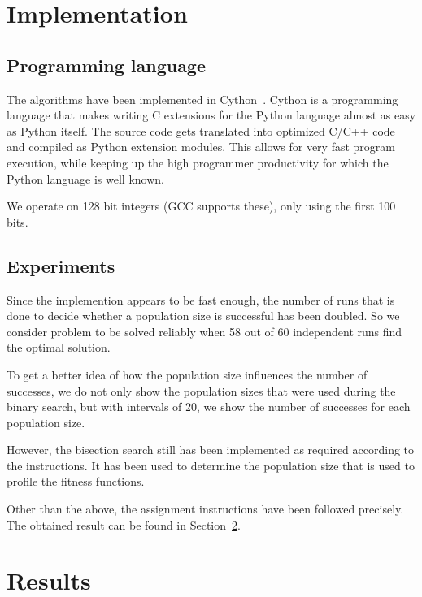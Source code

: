 \documentclass[12pt]{article}
\theoremstyle{definition}
\begin{document}
\maketitle

\section{Implementation}

\subsection*{Programming language}
The algorithms have been implemented in Cython~\cite{cython}.
Cython is a programming language that makes writing C extensions for the Python language
almost as easy as Python itself.
The source code gets translated into optimized C/C++ code and compiled as Python extension
modules.
This allows for very fast program execution, while keeping up the high programmer
productivity for which the Python language is well known.

We operate on 128 bit integers (GCC supports these), only using the first 100 bits.

\subsection*{Experiments}
Since the implemention appears to be fast enough, the number of runs that is done to decide whether a population size is successful has been doubled.
So we consider problem to be solved reliably when 58 out of 60 independent runs find the optimal solution.

To get a better idea of how the population size influences the number of successes, we do not only show the population sizes that were used during the binary search, but with intervals of 20, we show the number of successes for each population size.

However, the bisection search still has been implemented as required according to the instructions.
It has been used to determine the population size that is used to profile the fitness functions.

Other than the above, the assignment instructions have been followed precisely.
The obtained result can be found in Section~\ref{observations}.


\section{Results}
\label{observations}
\end{document}
